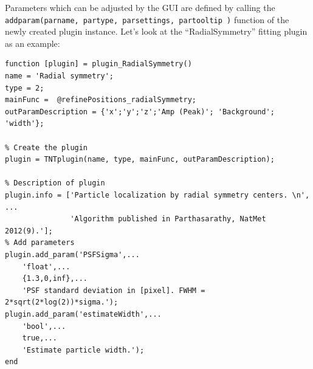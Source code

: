 \documentclass[11pt,onside]{report}
\numberwithin{equation}{chapter}
\begin{document}
Parameters which can be adjusted by the GUI are defined by calling the \texttt{add\textunderscore param(par\textunderscore name, par\textunderscore type, par\textunderscore settings, par\textunderscore tooltip )} function of the newly created plugin instance. Let's look at the ``RadialSymmetry'' fitting plugin as an example:
\begin{lstlisting}[style=Matlab-editor]
function [plugin] = plugin_RadialSymmetry()
name = 'Radial symmetry';
type = 2;
mainFunc =  @refinePositions_radialSymmetry;
outParamDescription = {'x';'y';'z';'Amp (Peak)'; 'Background'; 'width'};

% Create the plugin
plugin = TNTplugin(name, type, mainFunc, outParamDescription);

% Description of plugin
plugin.info = ['Particle localization by radial symmetry centers. \n', ...
               'Algorithm published in Parthasarathy, NatMet 2012(9).'];
% Add parameters
plugin.add_param('PSFSigma',...
    'float',...
    {1.3,0,inf},...
    'PSF standard deviation in [pixel]. FWHM = 2*sqrt(2*log(2))*sigma.');
plugin.add_param('estimateWidth',...
    'bool',...
    true,...
    'Estimate particle width.');
end
\end{lstlisting}
 
\end{document}
